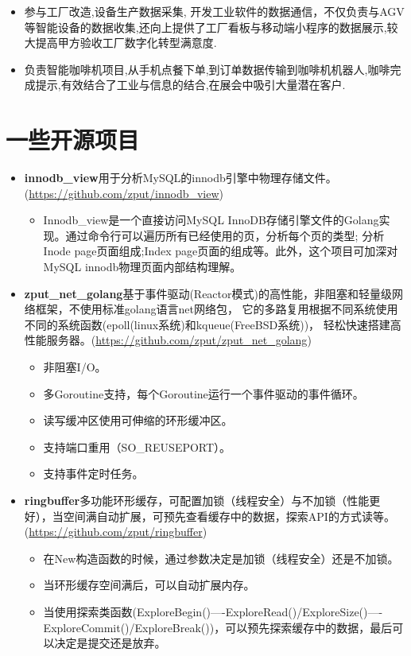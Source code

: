 \documentclass{resume}
\begin{document}
\begin{itemize}[parsep=0.2ex]
  \item 参与工厂改造,设备生产数据采集, 开发工业软件的数据通信，不仅负责与AGV等智能设备的数据收集,还向上提供了工厂看板与移动端小程序的数据展示,较大提高甲方验收工厂数字化转型满意度.
  \item 负责智能咖啡机项目,从手机点餐下单,到订单数据传输到咖啡机机器人,咖啡完成提示,有效结合了工业与信息的结合,在展会中吸引大量潜在客户.
\end{itemize}

\section{一些开源项目}
\begin{itemize}[parsep=0.2ex]
  \item \textbf{innodb\_view}用于分析MySQL的innodb引擎中物理存储文件。(\url{https://github.com/zput/innodb_view})
    \begin{itemize}[parsep=0.2ex]
        \item Innodb\_view是一个直接访问MySQL InnoDB存储引擎文件的Golang实现。通过命令行可以遍历所有已经使用的页，分析每个页的类型; 分析Inode page页面组成;Index page页面的组成等。此外，这个项目可加深对MySQL innodb物理页面内部结构理解。
    \end{itemize}

  \item \textbf{zput\_net\_golang}基于事件驱动(Reactor模式)的高性能，非阻塞和轻量级网络框架，不使用标准golang语言net网络包， 它的多路复用根据不同系统使用不同的系统函数(epoll(linux系统)和kqueue(FreeBSD系统))， 轻松快速搭建高性能服务器。(\url{https://github.com/zput/zput_net_golang})
    \begin{itemize}[parsep=0.2ex]
          \item 非阻塞I/O。
          \item 多Goroutine支持，每个Goroutine运行一个事件驱动的事件循环。
          \item 读写缓冲区使用可伸缩的环形缓冲区。
          \item 支持端口重用（SO\_REUSEPORT）。
          \item 支持事件定时任务。
    \end{itemize}

  \item \textbf{ringbuffer}多功能环形缓存，可配置加锁（线程安全）与不加锁（性能更好），当空间满自动扩展，可预先查看缓存中的数据，探索API的方式读等。(\url{https://github.com/zput/ringbuffer})
    \begin{itemize}[parsep=0.2ex]
          \item 在New构造函数的时候，通过参数决定是加锁（线程安全）还是不加锁。
          \item 当环形缓存空间满后，可以自动扩展内存。
          \item 当使用探索类函数(ExploreBegin()----ExploreRead()/ExploreSize()----ExploreCommit()/ExploreBreak())，可以预先探索缓存中的数据，最后可以决定是提交还是放弃。
    \end{itemize}


\end{itemize}
\end{document}
